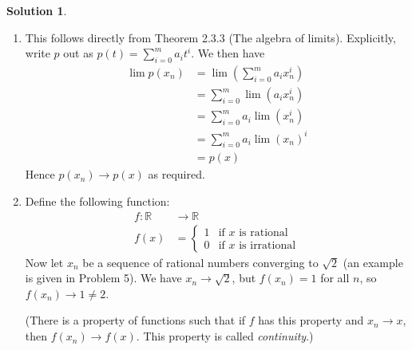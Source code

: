\documentclass[12pt]{article}
\theoremstyle{definition}
\theoremstyle{definition}
\newtheorem*{soln}{Solution}
\newcommand{\R}{\mathbb{R}}
\begin{document}
\begin{soln}
\begin{enumerate}[label=(\alph*)]
\item This follows directly from Theorem 2.3.3 (The algebra of limits). Explicitly, write $p$ out as $p(t)=\sum_{i=0}^m a_it^i$. We then have
\begin{align*}
\lim p(x_n) &= \lim\left(\sum_{i=0}^m a_ix_n^i\right) \tag{using our definition of $p$}\\
&= \sum_{i=0}^m \lim(a_ix_n^i) \tag{Theorem 2.3.3(a), limit of sum is sum of limits}\\
&= \sum_{i=0}^m a_i\lim(x_n^i) \tag{Theorem 2.3.3(b), limit of scalar multiple is scalar multiple of limit}\\
&= \sum_{i=0}^m a_i \lim(x_n)^i \tag{Theorem 2.3.3(c), limit of product is product of limits}\\
&= p(x) \tag{definition of $p$ and $\lim x_n=x$.}
\end{align*}
Hence $p(x_n)\to p(x)$ as required.

\item Define the following function:
\begin{align*}
f:\R &\to \R\\
f(x) &= \begin{cases} 1 &\text{if $x$ is rational} \\ 0 &\text{if $x$ is irrational} \end{cases}
\end{align*}
Now let $x_n$ be a sequence of rational numbers converging to $\sqrt{2}$ (an example is given in Problem 5). We have $x_n\to \sqrt{2}$, but $f(x_n)=1$ for all $n$, so $f(x_n)\to 1\neq 2$.

{\small (There is a property of functions such that if $f$ has this property and $x_n\to x$, then $f(x_n)\to f(x)$. This property is called \emph{continuity}.)}
\end{enumerate}
\end{soln}
\end{document}
